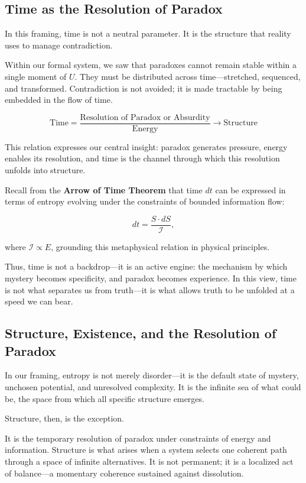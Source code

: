 \documentclass[12pt]{article}
\begin{document}
\subsection{Time as the Resolution of Paradox}

In this framing, time is not a neutral parameter. It is the structure that reality uses to manage contradiction.

Within our formal system, we saw that paradoxes cannot remain stable within a single moment of \( U \). They must be distributed across time—stretched, sequenced, and transformed. Contradiction is not avoided; it is made tractable by being embedded in the flow of time.

\[
\text{Time} = \frac{\text{Resolution of Paradox or Absurdity}}{\text{Energy}} \to \text{Structure}
\]

This relation expresses our central insight: paradox generates pressure, energy enables its resolution, and time is the channel through which this resolution unfolds into structure.

Recall from the \textbf{Arrow of Time Theorem} that time \( dt \) can be expressed in terms of entropy evolving under the constraints of bounded information flow:

\[
dt = \frac{S \cdot dS}{\mathcal{I}},
\]

where \( \mathcal{I} \propto E \), grounding this metaphysical relation in physical principles.

Thus, time is not a backdrop—it is an active engine: the mechanism by which mystery becomes specificity, and paradox becomes experience. In this view, time is not what separates us from truth—it is what allows truth to be unfolded at a speed we can bear.

\subsection{Structure, Existence, and the Resolution of Paradox}

In our framing, entropy is not merely disorder—it is the default state of mystery, unchosen potential, and unresolved complexity. It is the infinite sea of what could be, the space from which all specific structure emerges.

Structure, then, is the exception.

It is the temporary resolution of paradox under constraints of energy and information. Structure is what arises when a system selects one coherent path through a space of infinite alternatives. It is not permanent; it is a localized act of balance—a momentary coherence sustained against dissolution.
\end{document}

